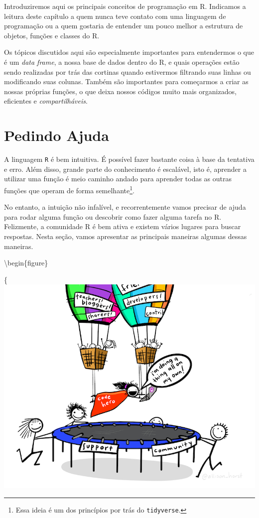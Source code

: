 \documentclass[
]{book}
\begin{document}
Introduziremos aqui os principais conceitos de programação em R. Indicamos a leitura deste capítulo a quem nunca teve contato com uma linguagem de programação ou a quem gostaria de entender um pouco melhor a estrutura de objetos, funções e classes do R.

Os tópicos discutidos aqui são especialmente importantes para entendermos o que é um \emph{data frame}, a nossa base de dados dentro do R, e quais operações estão sendo realizadas por trás das cortinas quando estivermos filtrando suas linhas ou modificando suas colunas. Também são importantes para começarmos a criar as nossas próprias funções, o que deixa nossos códigos muito mais organizados, eficientes e \emph{compartilháveis}.

\hypertarget{pedindo-ajuda}{%
\section{Pedindo Ajuda}\label{pedindo-ajuda}}

A linguagem \texttt{R} é bem intuitiva. É possível fazer bastante coisa à base da tentativa e erro. Além disso, grande parte do conhecimento é escalável, isto é, aprender a utilizar uma função é meio caminho andado para aprender todas as outras funções que operam de forma semelhante\footnote{Essa ideia é um dos princípios por trás do \texttt{tidyverse}.}.

No entanto, a intuição não infalível, e recorrentemente vamos precisar de ajuda para rodar alguma função ou descobrir como fazer alguma tarefa no R. Felizmente, a comunidade R é bem ativa e existem vários lugares para buscar respostas. Nesta seção, vamos apresentar as principais maneiras algumas dessas maneiras.

\textbackslash begin\{figure\}

\{\centering \includegraphics[width=11.49in]{assets/img/r-base/code_hero_rstats}
\end{document}
